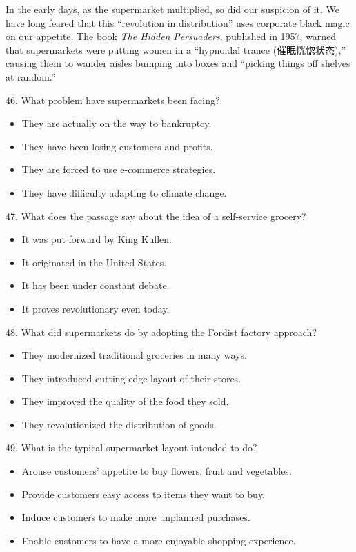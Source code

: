 \documentclass[UTF8,11pt]{ctexart}
\begin{document}
In the early days, as the supermarket multiplied, so did our suspicion of it. We have long feared that this “revolution in distribution” uses corporate black magic on our appetite. The book \textit{The Hidden} \textit{Persuaders}, published in 1957, warned that supermarkets were putting women in a “hypnoidal trance (催眠恍惚状态),” causing them to wander aisles bumping into boxes and “picking things off shelves at random.”


46. What problem have supermarkets been facing?


\begin{itemize}[leftmargin=2em,itemsep=.2em,topsep=.4em]\item[A.] They are actually on the way to bankruptcy.
\item[B.] They have been losing customers and profits.
\item[C.] They are forced to use e-commerce strategies.
\item[D.] They have difficulty adapting to climate change.
\end{itemize}

47. What does the passage say about the idea of a self-service grocery?


\begin{itemize}[leftmargin=2em,itemsep=.2em,topsep=.4em]\item[A.] It was put forward by King Kullen.
\item[B.] It originated in the United States.
\item[C.] It has been under constant debate.
\item[D.] It proves revolutionary even today.
\end{itemize}

48. What did supermarkets do by adopting the Fordist factory approach?


\begin{itemize}[leftmargin=2em,itemsep=.2em,topsep=.4em]\item[A.] They modernized traditional groceries in many ways.
\item[B.] They introduced cutting-edge layout of their stores.
\item[C.] They improved the quality of the food they sold.
\item[D.] They revolutionized the distribution of goods.
\end{itemize}

49. What is the typical supermarket layout intended to do?


\begin{itemize}[leftmargin=2em,itemsep=.2em,topsep=.4em]\item[A.] Arouse customers’ appetite to buy flowers, fruit and vegetables.
\item[B.] Provide customers easy access to items they want to buy.
\item[C.] Induce customers to make more unplanned purchases.
\item[D.] Enable customers to have a more enjoyable shopping experience.
\end{itemize}
\end{document}
